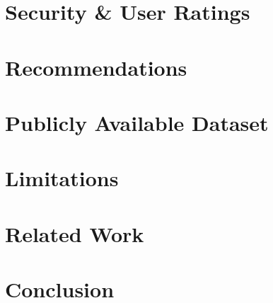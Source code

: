 \documentclass{sig-alternate}
\begin{document}
\section{Security \& User Ratings}
\label{sec: userratings}





\section{Recommendations}
\label{sec:recommendations}







\section{Publicly Available Dataset}
\label{sec:dataset}




\section{Limitations}
\label{sec:limitations}




\section{Related Work}
\label{sec: relatedwork}
%








\section{Conclusion}
\label{sec: conclusion}





\balance


\end{document}
